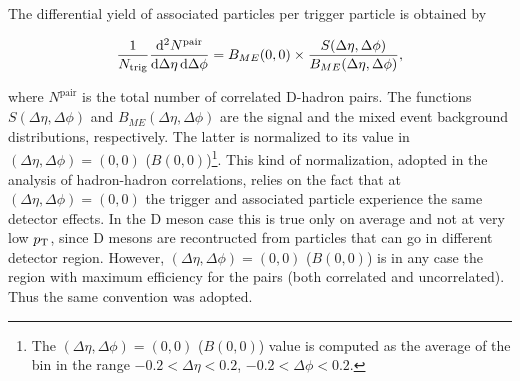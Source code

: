 \begin{enumerate}
The differential yield of associated particles per trigger particle is obtained by
\begin{linenomath}
  \begin{equation}
    \label{2pcorr_incl}
    \frac{1}{N_\text{trig}}\frac{\mathrm{d}^{2}N^\text{pair}}{\mathrm{d}\Delta\eta\, \mathrm{d}\Delta\phi}
= B_{ME}(0,0)\times\frac{S(\Delta\eta,\Delta\phi)}{B_{ME}(\Delta\eta,\Delta\phi)},
\end{equation}
\end{linenomath}
where $N^\text{pair}$ is the total number of correlated D-hadron
pairs. The functions $S(\Delta\eta,\Delta\phi)$ and
$B_{ME}(\Delta\eta,\Delta\phi)$ are the signal and the mixed event
background distributions, respectively. The latter is normalized to its value in
$(\Delta\eta,\Delta\phi)=(0,0)$ ($B(0,0)$)\footnote{The $(\Delta\eta,\Delta\phi)=(0,0)$ ($B(0,0)$) value is computed as the average of the bin in the range $-0.2 < \Delta\eta < 0.2$, $-0.2 < \Delta\phi < 0.2$.}. This kind of normalization, adopted in the analysis
of hadron-hadron correlations, relies on the fact that at $(\Delta\eta,\Delta\phi)=(0,0)$
the trigger and associated particle experience the same detector effects. In the D meson case this is true
only on average and not at very low $p_{\rm T}$, since D mesons are recontructed from particles that can go
in different detector region. However, $(\Delta\eta,\Delta\phi)=(0,0)$ ($B(0,0)$) is in any case
the region with maximum efficiency for the pairs (both correlated and uncorrelated). Thus the same
convention was adopted.


\end{enumerate}
